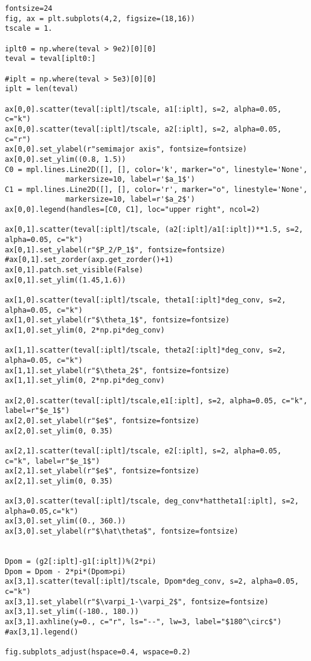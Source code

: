 \documentclass[11pt]{article}
\begin{document}
\begin{verbatim}
fontsize=24
fig, ax = plt.subplots(4,2, figsize=(18,16))
tscale = 1.

iplt0 = np.where(teval > 9e2)[0][0]
teval = teval[iplt0:]

#iplt = np.where(teval > 5e3)[0][0]
iplt = len(teval)

ax[0,0].scatter(teval[:iplt]/tscale, a1[:iplt], s=2, alpha=0.05, c="k")
ax[0,0].scatter(teval[:iplt]/tscale, a2[:iplt], s=2, alpha=0.05, c="r")
ax[0,0].set_ylabel(r"semimajor axis", fontsize=fontsize)
ax[0,0].set_ylim((0.8, 1.5))
C0 = mpl.lines.Line2D([], [], color='k', marker="o", linestyle='None',
		      markersize=10, label=r'$a_1$')
C1 = mpl.lines.Line2D([], [], color='r', marker="o", linestyle='None',
		      markersize=10, label=r'$a_2$')
ax[0,0].legend(handles=[C0, C1], loc="upper right", ncol=2)

ax[0,1].scatter(teval[:iplt]/tscale, (a2[:iplt]/a1[:iplt])**1.5, s=2, alpha=0.05, c="k")
ax[0,1].set_ylabel(r"$P_2/P_1$", fontsize=fontsize)
#ax[0,1].set_zorder(axp.get_zorder()+1)
ax[0,1].patch.set_visible(False)
ax[0,1].set_ylim((1.45,1.6))

ax[1,0].scatter(teval[:iplt]/tscale, theta1[:iplt]*deg_conv, s=2, alpha=0.05, c="k")
ax[1,0].set_ylabel(r"$\theta_1$", fontsize=fontsize)
ax[1,0].set_ylim(0, 2*np.pi*deg_conv)

ax[1,1].scatter(teval[:iplt]/tscale, theta2[:iplt]*deg_conv, s=2, alpha=0.05, c="k")
ax[1,1].set_ylabel(r"$\theta_2$", fontsize=fontsize)
ax[1,1].set_ylim(0, 2*np.pi*deg_conv)

ax[2,0].scatter(teval[:iplt]/tscale,e1[:iplt], s=2, alpha=0.05, c="k", label=r"$e_1$")
ax[2,0].set_ylabel(r"$e$", fontsize=fontsize)
ax[2,0].set_ylim(0, 0.35)

ax[2,1].scatter(teval[:iplt]/tscale, e2[:iplt], s=2, alpha=0.05, c="k", label=r"$e_1$")
ax[2,1].set_ylabel(r"$e$", fontsize=fontsize)
ax[2,1].set_ylim(0, 0.35)

ax[3,0].scatter(teval[:iplt]/tscale, deg_conv*hattheta1[:iplt], s=2, alpha=0.05,c="k")
ax[3,0].set_ylim((0., 360.))
ax[3,0].set_ylabel(r"$\hat\theta$", fontsize=fontsize)


Dpom = (g2[:iplt]-g1[:iplt])%(2*pi)
Dpom = Dpom - 2*pi*(Dpom>pi)
ax[3,1].scatter(teval[:iplt]/tscale, Dpom*deg_conv, s=2, alpha=0.05, c="k")
ax[3,1].set_ylabel(r"$\varpi_1-\varpi_2$", fontsize=fontsize)
ax[3,1].set_ylim((-180., 180.))
ax[3,1].axhline(y=0., c="r", ls="--", lw=3, label="$180^\circ$")
#ax[3,1].legend()

fig.subplots_adjust(hspace=0.4, wspace=0.2)


\end{verbatim}
\end{document}
